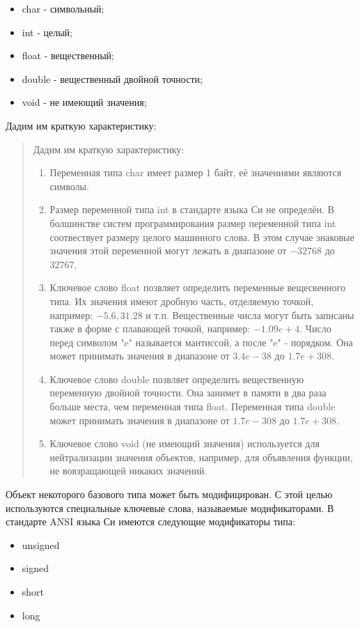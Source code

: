 \documentclass[a4paper, fontsize=10bp]{article} %
\begin{document}
\begin{itemize}
    \item char - символьный; 
    \item int - целый;
    \item float - вещественный;
    \item double - вещественный двойной точности;
    \item void - не имеющий значения;
\end{itemize}
Дадим им краткую характеристику:
\begin{quotation}{Дадим им краткую характеристику:}
    \begin{enumerate}
        \item Переменная типа char имеет размер 1 байт, её значениями являются символы.
        \item Размер переменной типа int в стандарте языка Си не определён. В болшинстве систем 
                программирования размер переменной типа int соотвествует размеру целого машинного 
                слова. В этом случае знаковые значения этой переменной могут лежать в диапазоне от 
                $-32768$ до $32767$.
        \item Ключевое слово float позвляет определить переменные вещесвенного типа. Их значения имеют 
                дробную часть, отделяемую точкой, например: $-5.6, 31.28$ и т.п. Вещественные числа 
                могут быть записаны также в форме с плавающей точкой, например: $-1.09e+4$. Число перед 
                символом "e" называется мантиссой, а после "e" - порядком. Она может принимать значения 
                в диапазоне от $3.4e-38$ до $1.7e+308$.
        \item Ключевое слово double позвляет определить вещественную переменную двойной точности.
                Она занимет в памяти в два раза больше места, чем переменная типа float. Переменная 
                типа double может принимать значения в диапазоне от $1.7e-308$ до $1.7e+308$.
        \item Ключевое слово void (не имеющий значения) используется для нейтрализации значения объектов, 
                например, для объявления функции, не вовзращающей никаких значений.
    \end{enumerate}
\end{quotation}
Объект некоторого базового типа может быть модифицирован. С этой целью используются специальные ключевые 
слова, называемые модификаторами. В стандарте ANSI языка Си имеются следующие модификаторы типа:
\begin{itemize}
    \item unsigned
    \item signed
    \item short
    \item long
\end{itemize}   
\end{document}
